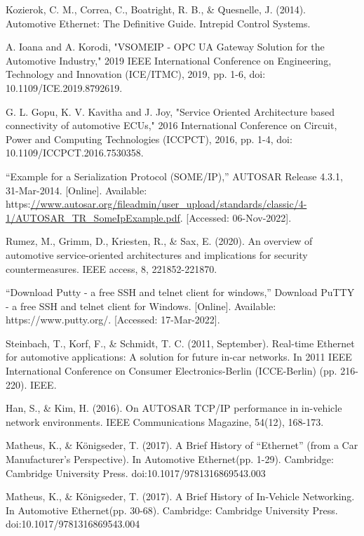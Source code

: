 \documentclass[a4paper, 12pt, oneside, BCOR1cm,toc=chapterentrywithdots]{scrbook}
\begin{document}
\begin{thebibliography}{00}
Kozierok, C. M., Correa, C., Boatright, R. B., \& Quesnelle, J. (2014). Automotive Ethernet: The Definitive Guide. Intrepid Control Systems.

A. Ioana and A. Korodi, "VSOMEIP - OPC UA Gateway Solution for the Automotive Industry," 2019 IEEE International Conference on Engineering, Technology and Innovation (ICE/ITMC), 2019, pp. 1-6, doi: 10.1109/ICE.2019.8792619.

G. L. Gopu, K. V. Kavitha and J. Joy, "Service Oriented Architecture based connectivity of automotive ECUs," 2016 International Conference on Circuit, Power and Computing Technologies (ICCPCT), 2016, pp. 1-4, doi: 10.1109/ICCPCT.2016.7530358.

“Example for a Serialization Protocol (SOME/IP),” AUTOSAR Release 4.3.1, 31-Mar-2014. [Online]. Available: https:\url{//www.autosar.org/fileadmin/user\_upload/standards/classic/4-1/AUTOSAR\_TR\_SomeIpExample.pdf}. [Accessed: 06-Nov-2022]. 

Rumez, M., Grimm, D., Kriesten, R., \& Sax, E. (2020). An overview of automotive service-oriented architectures and implications for security countermeasures. IEEE access, 8, 221852-221870.

“Download Putty - a free SSH and telnet client for windows,” Download PuTTY - a free SSH and telnet client for Windows. [Online]. Available: https://www.putty.org/. [Accessed: 17-Mar-2022]. 

 Steinbach, T., Korf, F., \& Schmidt, T. C. (2011, September). Real-time Ethernet for automotive applications: A solution for future in-car networks. In 2011 IEEE International Conference on Consumer Electronics-Berlin (ICCE-Berlin) (pp. 216-220). IEEE.


 Han, S., \& Kim, H. (2016). On AUTOSAR TCP/IP performance in in-vehicle network environments. IEEE Communications Magazine, 54(12), 168-173.

 Matheus, K., \& Königseder, T. (2017). A Brief History of “Ethernet” (from a Car Manufacturer's Perspective). In Automotive Ethernet(pp. 1-29). Cambridge: Cambridge University Press. doi:10.1017/9781316869543.003 

Matheus, K., \& Königseder, T. (2017). A Brief History of In-Vehicle Networking. In Automotive Ethernet(pp. 30-68). Cambridge: Cambridge University Press. doi:10.1017/9781316869543.004


\end{thebibliography}
\end{document}

